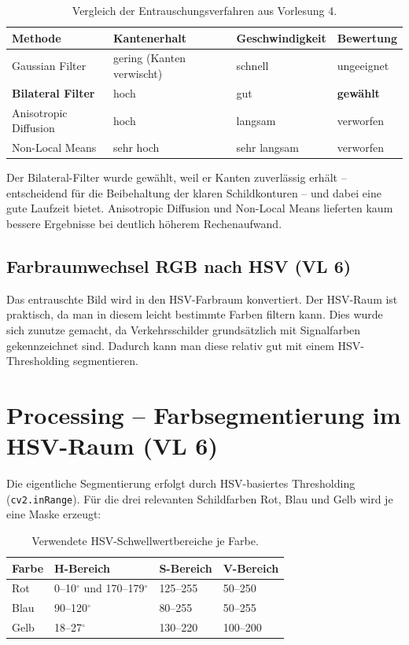 \documentclass[12pt,oneside]{article}
\begin{document}
\begin{table}[H]
\centering
\begin{tabular}{|l|l|l|l|}
\hline
\textbf{Methode} & \textbf{Kantenerhalt} & \textbf{Geschwindigkeit} & \textbf{Bewertung} \\
\hline
Gaussian Filter & gering (Kanten verwischt) & schnell & ungeeignet \\
\textbf{Bilateral Filter} & hoch & gut & \textbf{gewählt} \\
Anisotropic Diffusion & hoch & langsam & verworfen \\
Non-Local Means & sehr hoch & sehr langsam & verworfen \\
\hline
\end{tabular}
\caption{Vergleich der Entrauschungsverfahren aus Vorlesung 4.}
\end{table}

Der Bilateral-Filter wurde gewählt, weil er Kanten zuverlässig erhält -- entscheidend für die Beibehaltung der klaren Schildkonturen -- und dabei eine gute Laufzeit bietet. Anisotropic Diffusion und Non-Local Means lieferten kaum bessere Ergebnisse bei deutlich höherem Rechenaufwand.

\subsection{Farbraumwechsel RGB nach HSV (VL 6)}

Das \glqq entrauschte\grqq{} Bild wird in den HSV-Farbraum konvertiert. Der HSV-Raum ist praktisch, da man in diesem leicht bestimmte Farben filtern kann. Dies wurde sich zunutze gemacht, da Verkehrsschilder grundsätzlich mit Signalfarben gekennzeichnet sind. Dadurch kann man diese relativ gut mit einem HSV-Thresholding segmentieren.

\section{Processing -- Farbsegmentierung im HSV-Raum (VL 6)}

Die eigentliche Segmentierung erfolgt durch HSV-basiertes Thresholding (\texttt{cv2.inRange}). Für die drei relevanten Schildfarben Rot, Blau und Gelb wird je eine Maske erzeugt:

\begin{table}[H]
\centering
\begin{tabular}{|l|l|l|l|}
\hline
\textbf{Farbe} & \textbf{H-Bereich} & \textbf{S-Bereich} & \textbf{V-Bereich} \\
\hline
Rot  & 0--10$^\circ$ und 170--179$^\circ$ & 125--255 & 50--250 \\
Blau & 90--120$^\circ$ & 80--255 & 50--255 \\
Gelb & 18--27$^\circ$ & 130--220 & 100--200 \\
\hline
\end{tabular}
\caption{Verwendete HSV-Schwellwertbereiche je Farbe.}
\end{table}
\end{document}
